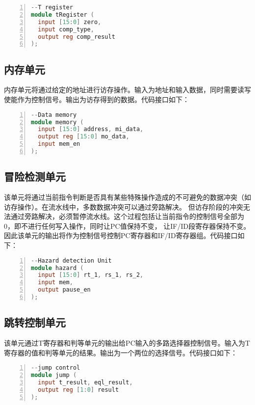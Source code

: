 \begin{lstlisting}[language=verilog,frame=single,breaklines,breaklines,basicstyle=\footnotesize\ttfamily,numbers=left]
--T register
module tRegister (
  input [15:0] zero,
  input comp_type,
  output reg comp_result
);
\end{lstlisting}

\subsection{内存单元}
内存单元将通过给定的地址进行访存操作。输入为地址和输入数据，同时需要读写使能作为控制信号。输出为访存得到的数据。代码接口如下：

\begin{lstlisting}[language=verilog,frame=single,breaklines,breaklines,basicstyle=\footnotesize\ttfamily,numbers=left]
--Data memory
module memory (
  input [15:0] address, mi_data,
  output reg [15:0] mo_data,
  input mem_en
);
\end{lstlisting}

\subsection{冒险检测单元}
该单元将通过当前指令判断是否具有某些特殊操作造成的不可避免的数据冲突（如访存操作）。在流水线中，多数数据冲突可以通过旁路解决。
但访存阶段的冲突无法通过旁路解决，必须暂停流水线。这个过程包括让当前指令的控制信号全部为0，即不进行任何写入操作，同时让PC值保持不变，
让IF/ID段寄存器保持不变。因此该单元的输出将作为控制信号控制PC寄存器和IF/ID寄存器组。代码接口如下：

\begin{lstlisting}[language=verilog,frame=single,breaklines,breaklines,basicstyle=\footnotesize\ttfamily,numbers=left]
--Hazard detection Unit
module hazard (
  input [15:0] rt_1, rs_1, rs_2,
  input mem,
  output pause_en
);
\end{lstlisting}

\subsection{跳转控制单元}
该单元通过T寄存器和判等单元的输出给PC输入的多路选择器控制信号。输入为T寄存器的值和判等单元的结果。输出为一个两位的选择信号。代码接口如下：

\begin{lstlisting}[language=verilog,frame=single,breaklines,breaklines,basicstyle=\footnotesize\ttfamily,numbers=left]
--jump control
module jump (
  input t_result, eql_result,
  output reg [1:0] result
);
\end{lstlisting}

